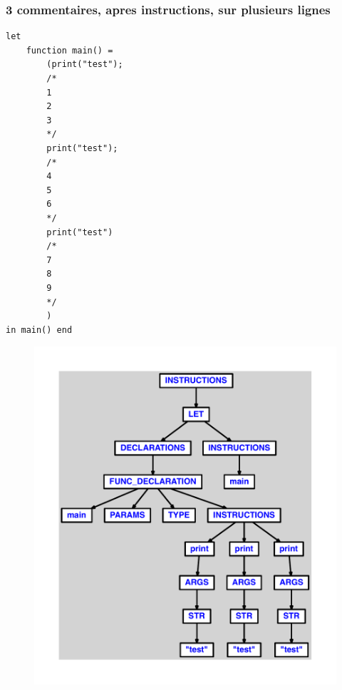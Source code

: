 \documentclass{article}
\begin{document}
\subsubsection{3 commentaires, apres instructions, sur plusieurs lignes}
\begin{lstlisting}
let
	function main() =
		(print("test");
		/*
		1
		2
		3
		*/
		print("test");
		/*
		4
		5
		6
		*/
		print("test")
		/*
		7
		8
		9
		*/
		)
in main() end
\end{lstlisting}
\newpage
\begin{figure}[H]
\centering
\includegraphics[max width=\textwidth]{ast/ast_161.pdf}
\end{figure}
\newpage
\end{document}
